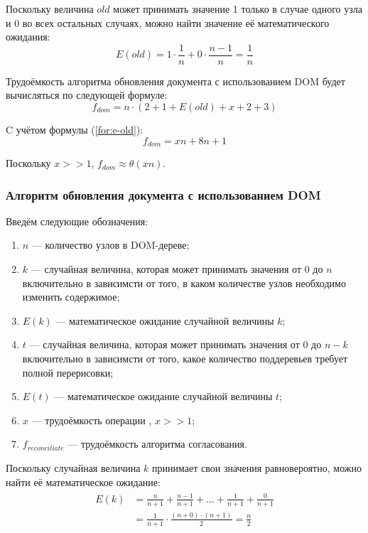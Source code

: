 Поскольку величина $old$ может принимать значение 1 только в случае одного узла и 0 во всех остальных случаях, можно найти значение её математического ожидания:
\begin{equation}
	\label{for:e-old}
	E(old) = 1 \cdot \frac{1}{n} + 0 \cdot \frac{n - 1}{n} = \frac{1}{n}
\end{equation}

Трудоёмкость алгоритма обновления документа с использованием DOM будет вычисляться по следующей формуле:
\begin{equation}
	\label{for:f-dom-1}
	f_{dom} = n \cdot (2 + 1 + E(old) + x + 2 + 3)
\end{equation}

C учётом формулы (\ref{for:e-old}):
\begin{equation}
	\label{for:f-dom-2}
	f_{dom} = xn + 8n + 1
\end{equation}

Поскольку $x >> 1$, $f_{dom} \approx \theta(xn)$.

\subsubsection{Алгоритм обновления документа с использованием DOM}
Введём следующие обозначения:
\begin{enumerate}[label=\arabic*)]
	\item $n$ --- количество узлов в DOM-дереве;
	\item $k$ --- случайная величина, которая может принимать значения от 0 до $n$ включительно в зависимсти от того, в каком количестве узлов необходимо изменить содержимое;
	\item $E(k)$ --- математическое ожидание случайной величины $k$;
	\item $t$ --- случайная величина, которая может принимать значения от 0 до $n - k$ включительно в зависимсти от того, какое количество поддеревьев требует полной перерисовки;
	\item $E(t)$ --- математическое ожидание случайной величины $t$;
	\item $x$ --- трудоёмкость операции , $x >> 1$;
	\item $f_{reconciliate}$ --- трудоёмкость алгоритма согласования.
\end{enumerate}

Поскольку случайная величина $k$ принимает свои значения равновероятно, можно найти её математическое ожидание:
\begin{align}
	\begin{split}
		\label{for:e-k}
		E(k) &= \frac{n}{n + 1} + \frac{n - 1}{n + 1}  + \dotsc + \frac{1}{n + 1} + \frac{0}{n + 1} \\
		&= \frac{1}{n + 1} \cdot \frac{(n + 0)\cdot(n + 1)}{2} = \frac{n}{2}
	\end{split}
\end{align}

